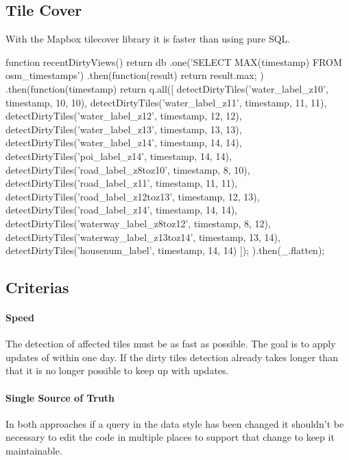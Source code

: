 \subsection{Tile Cover}

With the Mapbox tilecover library it is faster than using pure SQL.

\begin{javascriptcode}
function recentDirtyViews() {
    return db
        .one('SELECT MAX(timestamp) FROM osm_timestamps')
        .then(function(result) { return result.max; })
        .then(function(timestamp) {
            return q.all([
                detectDirtyTiles('water_label_z10', timestamp, 10, 10),
                detectDirtyTiles('water_label_z11', timestamp, 11, 11),
                detectDirtyTiles('water_label_z12', timestamp, 12, 12),
                detectDirtyTiles('water_label_z13', timestamp, 13, 13),
                detectDirtyTiles('water_label_z14', timestamp, 14, 14),
                detectDirtyTiles('poi_label_z14', timestamp, 14, 14),
                detectDirtyTiles('road_label_z8toz10', timestamp, 8, 10),
                detectDirtyTiles('road_label_z11', timestamp, 11, 11),
                detectDirtyTiles('road_label_z12toz13', timestamp, 12, 13),
                detectDirtyTiles('road_label_z14', timestamp, 14, 14),
                detectDirtyTiles('waterway_label_z8toz12', timestamp, 8, 12),
                detectDirtyTiles('waterway_label_z13toz14', timestamp, 13, 14),
                detectDirtyTiles('housenum_label', timestamp, 14, 14)
            ]);
        }).then(_.flatten);
}
\end{javascriptcode}

\subsection{Criterias}\label{criterias}

\paragraph{Speed} 
The detection of affected tiles must be as fast as possible. 
The goal is to apply updates of \osm{} within one day. If the dirty tiles detection
already takes longer than that it is no longer possible to keep up with \osm{} updates.

\paragraph{Single Source of Truth}

In both approaches if a query in the data style has been changed it shouldn't be necessary
to edit the code in multiple places to support that change to keep it maintainable.


